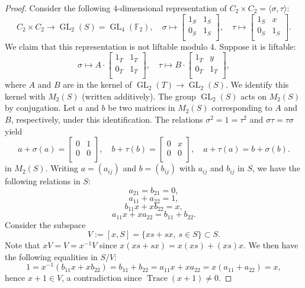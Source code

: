 \documentclass[12pt]{amsart}
\numberwithin{equation}{section}
\theoremstyle{definition}
\renewcommand{\(}{\bigl(}
\renewcommand{\)}{\bigr)}
\newcommand{\inv}{^{-1}}
\newcommand{\GL}{\operatorname{GL}}
\newcommand{\F}{\mathbb{F}}
\begin{document}
\begin{proof}
 Consider the following $4$-dimensional representation of $C_2 \times C_2=\langle \sigma,\tau\rangle$:
 \[
C_2 \times C_2\to \GL_2(S)=\GL_4(\F_2),\quad \sigma\mapsto
 \begin{bmatrix}
  1_S &   1_S\\
 0_S  & 1_S\\
 \end{bmatrix}, \quad
 \tau\mapsto \begin{bmatrix}
  1_S &   x\\
 0_S  & 1_S\\
 \end{bmatrix}.
 \]
 We claim that this representation is not liftable modulo $4$. Suppose it is liftable:
 \[
\sigma\mapsto A\cdot
 \begin{bmatrix}
  1_{T} &   1_{T}\\
 0_{T}  & 1_{T}\\
 \end{bmatrix}, \quad
 \tau\mapsto B \cdot \begin{bmatrix}
  1_{T} &   {y}\\
 0_{T}  & 1_{T}\\
 \end{bmatrix},
 \]
 where $A$ and $B$ are in the kernel of $\GL_2(T)\to \GL_2(S)$.
 We identify this kernel  with $M_2(S)$
 (written additively). The group $\GL_2(S)$ acts on $M_2(S)$ by conjugation.
 Let $a$ and $b$ be two matrices in $M_2(S)$ corresponding to $A$ and $B$, respectively, under this identification.
 The relations $\sigma^2=1=\tau^2$ and $\sigma\tau=\tau\sigma$ yield
 \[
 a+\sigma(a)=\begin{bmatrix}
  0 &   1\\
 0  & 0\\
 \end{bmatrix},\quad
 b+\tau(b)=\begin{bmatrix}
  0 &   x\\
 0  & 0\\
 \end{bmatrix},\quad a+ \tau(a)=b+ \sigma(b).
 \]
 in $M_2(S)$. Writing $a=(a_{ij})$ and $b=(b_{ij})$ with $a_{ij}$ and  $b_{ij}$ in $S$,
 we have the following relations in $S$:
 \[
 a_{21}=b_{21}=0,
 \]
 \[
 a_{11}+a_{22}=1,
 \]
 \[
 b_{11}x + xb_{22}=x,
 \]
\[
 a_{11}x + xa_{22}=b_{11} + b_{22}.
 \]
Consider the subspace
\[
V:=[x, S]=\{xs+ sx,\ s\in S\}\subset S.
\]
Note that $xV=V=x\inv V$ since $x(xs+ sx)=x(xs)+(xs)x$. We then have the following equalities in $S/V$:
\[
1=x\inv (b_{11}x + xb_{22})=b_{11} + b_{22}=a_{11}x + xa_{22}=
x(a_{11}+a_{22})=x,
\]
hence $x+1\in V$, a contradiction since $\operatorname{Trace}(x+1)\neq 0$.
\end{proof}
\end{document}
